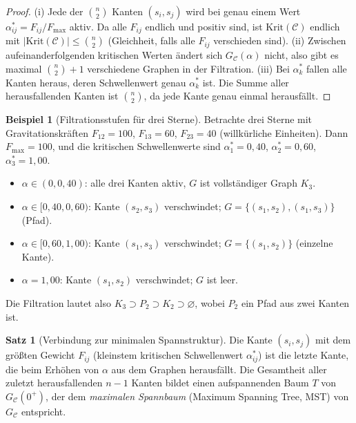 ﻿\documentclass[a4paper,12pt]{report}
\theoremstyle{definition}
\newtheorem{beispiel}{Beispiel}
\newtheorem{satz}{Satz}
\begin{document}
\begin{proof}
(i) Jede der $\binom{n}{2}$ Kanten $(s_i, s_j)$ wird bei genau einem Wert $\alpha^*_{ij} = F_{ij}/F_\mathrm{max}$ aktiv. Da alle $F_{ij}$ endlich und positiv sind, ist $\mathrm{Krit}(\mathcal{C})$ endlich mit $|\mathrm{Krit}(\mathcal{C})| \leq \binom{n}{2}$ (Gleichheit, falls alle $F_{ij}$ verschieden sind). (ii) Zwischen aufeinanderfolgenden kritischen Werten ändert sich $G_\mathcal{C}(\alpha)$ nicht, also gibt es maximal $\binom{n}{2}+1$ verschiedene Graphen in der Filtration. (iii) Bei $\alpha^*_k$ fallen alle Kanten heraus, deren Schwellenwert genau $\alpha^*_k$ ist. Die Summe aller herausfallenden Kanten ist $\binom{n}{2}$, da jede Kante genau einmal herausfällt.
\end{proof}

\begin{beispiel}[Filtrationsstufen für drei Sterne]
\label{bsp:filtration_drei}
Betrachte drei Sterne mit Gravitationskräften $F_{12} = 100$, $F_{13} = 60$, $F_{23} = 40$ (willkürliche Einheiten). Dann $F_\mathrm{max} = 100$, und die kritischen Schwellenwerte sind $\alpha^*_1 = 0{,}40$, $\alpha^*_2 = 0{,}60$, $\alpha^*_3 = 1{,}00$.

\begin{itemize}
    \item $\alpha \in (0, 0{,}40)$: alle drei Kanten aktiv, $G$ ist vollständiger Graph $K_3$.
    \item $\alpha \in [0{,}40, 0{,}60)$: Kante $(s_2, s_3)$ verschwindet; $G = \{(s_1,s_2), (s_1,s_3)\}$ (Pfad).
    \item $\alpha \in [0{,}60, 1{,}00)$: Kante $(s_1, s_3)$ verschwindet; $G = \{(s_1, s_2)\}$ (einzelne Kante).
    \item $\alpha = 1{,}00$: Kante $(s_1, s_2)$ verschwindet; $G$ ist leer.
\end{itemize}

Die Filtration lautet also $K_3 \supset P_2 \supset K_2 \supset \varnothing$, wobei $P_2$ ein Pfad aus zwei Kanten ist.
\end{beispiel}

\begin{satz}[Verbindung zur minimalen Spannstruktur]
\label{satz:mst}
Die Kante $(s_i, s_j)$ mit dem größten Gewicht $F_{ij}$ (kleinstem kritischen Schwellenwert $\alpha^*_{ij}$) ist die letzte Kante, die beim Erhöhen von $\alpha$ aus dem Graphen herausfällt. Die Gesamtheit aller zuletzt herausfallenden $n-1$ Kanten bildet einen aufspannenden Baum $T$ von $G_\mathcal{C}(0^+)$, der dem \emph{maximalen Spannbaum} (Maximum Spanning Tree, MST) von $G_\mathcal{C}$ entspricht.
\end{satz}
\end{document}
